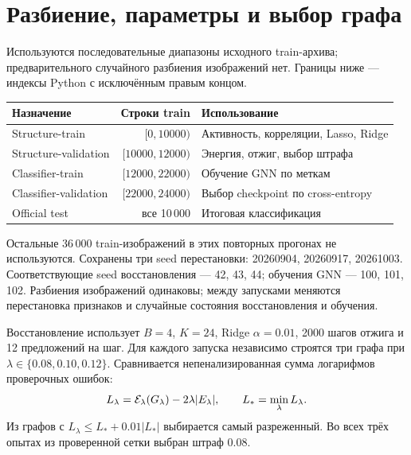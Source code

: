 \documentclass[11pt,a4paper]{article}
\begin{document}
\section{Разбиение, параметры и выбор графа}
Используются последовательные диапазоны исходного train-архива; предварительного
случайного разбиения изображений нет. Границы ниже --- индексы Python с исключённым правым концом.
\begin{center}\small
\begin{tabularx}{\linewidth}{@{}l r X@{}}\toprule
Назначение & Строки train & Использование\\\midrule
Structure-train & $[0,10000)$ & Активность, корреляции, Lasso, Ridge\\
Structure-validation & $[10000,12000)$ & Энергия, отжиг, выбор штрафа\\
Classifier-train & $[12000,22000)$ & Обучение GNN по меткам\\
Classifier-validation & $[22000,24000)$ & Выбор checkpoint по cross-entropy\\
Official test & все 10\,000 & Итоговая классификация\\\bottomrule
\end{tabularx}\end{center}
Остальные 36\,000 train-изображений в этих повторных прогонах не используются.
Сохранены три seed перестановки: 20260904, 20260917, 20261003.
Соответствующие seed восстановления --- 42, 43, 44; обучения GNN --- 100, 101, 102.
Разбиения изображений одинаковы; между запусками меняются перестановка признаков
и случайные состояния восстановления и обучения.
\par Восстановление использует $B=4$, $K=24$, Ridge $\alpha=0.01$,
2000 шагов отжига и 12 предложений на шаг. Для каждого запуска независимо строятся
три графа при $\lambda\in\{0.08,0.10,0.12\}$.
Сравнивается непенализированная сумма логарифмов проверочных ошибок:
\begin{equation}
 L_\lambda=\mathcal{E}_\lambda(G_\lambda)-2\lambda|E_\lambda|,\qquad
 L_*=\min_\lambda L_\lambda.
\end{equation}
Из графов с $L_\lambda\le L_*+0.01|L_*|$ выбирается самый разреженный.
Во всех трёх опытах из проверенной сетки выбран штраф $0.08$.

\clearpage
\end{document}
